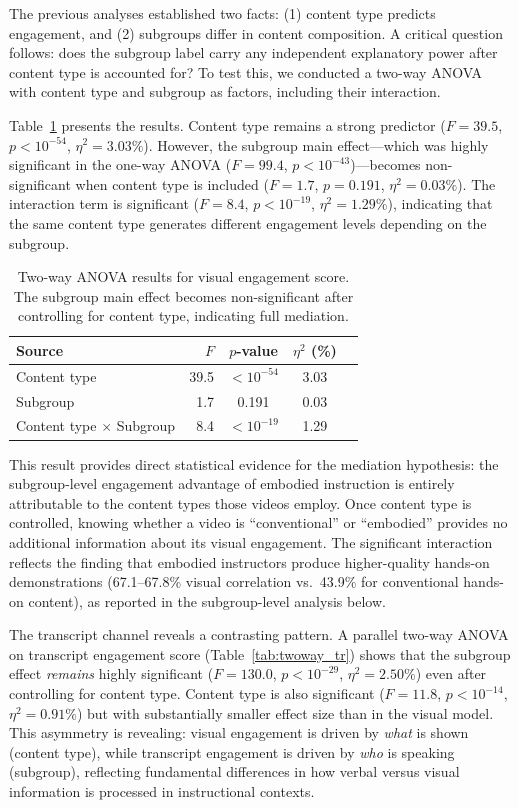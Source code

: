 \documentclass[fleqn,10pt]{wlscirep}
\begin{document}
The previous analyses established two facts: (1) content type predicts engagement, and (2) subgroups differ in content composition. A critical question follows: does the subgroup label carry any independent explanatory power after content type is accounted for? To test this, we conducted a two-way ANOVA with content type and subgroup as factors, including their interaction.

Table~\ref{tab:twoway} presents the results. Content type remains a strong predictor ($F = 39.5$, $p < 10^{-54}$, $\eta^2 = 3.03\%$). However, the subgroup main effect---which was highly significant in the one-way ANOVA ($F = 99.4$, $p < 10^{-43}$)---becomes non-significant when content type is included ($F = 1.7$, $p = 0.191$, $\eta^2 = 0.03\%$). The interaction term is significant ($F = 8.4$, $p < 10^{-19}$, $\eta^2 = 1.29\%$), indicating that the same content type generates different engagement levels depending on the subgroup.

\begin{table}[ht]
    \centering
    \caption{Two-way ANOVA results for visual engagement score. The subgroup main effect becomes non-significant after controlling for content type, indicating full mediation.}
    \label{tab:twoway}
    \begin{tabular}{lrccc}
        \toprule
        Source & $F$ & $p$-value & $\eta^2$ (\%) \\
        \midrule
        Content type & 39.5 & $< 10^{-54}$ & 3.03 \\
        Subgroup & 1.7 & 0.191 & 0.03 \\
        Content type $\times$ Subgroup & 8.4 & $< 10^{-19}$ & 1.29 \\
        \bottomrule
    \end{tabular}
\end{table}

This result provides direct statistical evidence for the mediation hypothesis: the subgroup-level engagement advantage of embodied instruction is entirely attributable to the content types those videos employ. Once content type is controlled, knowing whether a video is ``conventional'' or ``embodied'' provides no additional information about its visual engagement. The significant interaction reflects the finding that embodied instructors produce higher-quality hands-on demonstrations (67.1--67.8\% visual correlation vs.\ 43.9\% for conventional hands-on content), as reported in the subgroup-level analysis below.

The transcript channel reveals a contrasting pattern. A parallel two-way ANOVA on transcript engagement score (Table~\ref{tab:twoway_tr}) shows that the subgroup effect \emph{remains} highly significant ($F = 130.0$, $p < 10^{-29}$, $\eta^2 = 2.50\%$) even after controlling for content type. Content type is also significant ($F = 11.8$, $p < 10^{-14}$, $\eta^2 = 0.91\%$) but with substantially smaller effect size than in the visual model. This asymmetry is revealing: visual engagement is driven by \emph{what} is shown (content type), while transcript engagement is driven by \emph{who} is speaking (subgroup), reflecting fundamental differences in how verbal versus visual information is processed in instructional contexts.
\end{document}
